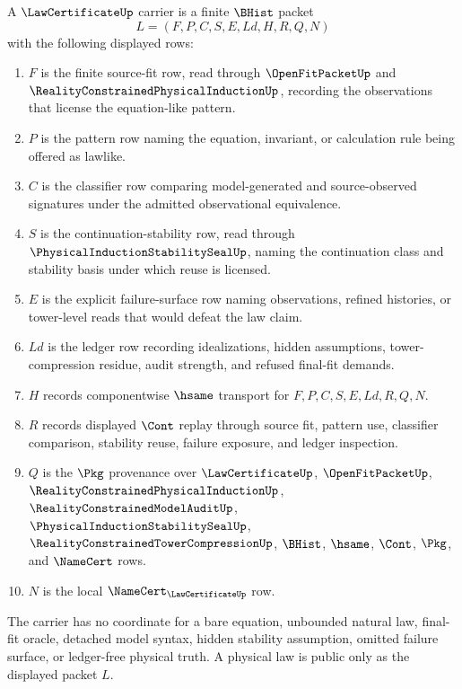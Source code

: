 \begin{definition}
\label{def:law-certificate-carrier}
A $\LawCertificateUp$ carrier is a finite $\BHist$ packet
$$
L=(F,P,C,S,E,Ld,H,R,Q,N)
$$
with the following displayed rows:
\begin{enumerate}
\item $F$ is the finite source-fit row, read through $\OpenFitPacketUp$ and $\RealityConstrainedPhysicalInductionUp$, recording the observations that license the equation-like pattern.
\item $P$ is the pattern row naming the equation, invariant, or calculation rule being offered as lawlike.
\item $C$ is the classifier row comparing model-generated and source-observed signatures under the admitted observational equivalence.
\item $S$ is the continuation-stability row, read through $\PhysicalInductionStabilitySealUp$, naming the continuation class and stability basis under which reuse is licensed.
\item $E$ is the explicit failure-surface row naming observations, refined histories, or tower-level reads that would defeat the law claim.
\item $Ld$ is the ledger row recording idealizations, hidden assumptions, tower-compression residue, audit strength, and refused final-fit demands.
\item $H$ records componentwise $\hsame$ transport for $F,P,C,S,E,Ld,R,Q,N$.
\item $R$ records displayed $\Cont$ replay through source fit, pattern use, classifier comparison, stability reuse, failure exposure, and ledger inspection.
\item $Q$ is the $\Pkg$ provenance over $\LawCertificateUp$, $\OpenFitPacketUp$, $\RealityConstrainedPhysicalInductionUp$, $\RealityConstrainedModelAuditUp$, $\PhysicalInductionStabilitySealUp$, $\RealityConstrainedTowerCompressionUp$, $\BHist$, $\hsame$, $\Cont$, $\Pkg$, and $\NameCert$ rows.
\item $N$ is the local $\NameCert_{\LawCertificateUp}$ row.
\end{enumerate}
The carrier has no coordinate for a bare equation, unbounded natural law, final-fit oracle, detached model syntax, hidden stability assumption, omitted failure surface, or ledger-free physical truth. A physical law is public only as the displayed packet $L$.
\end{definition}

